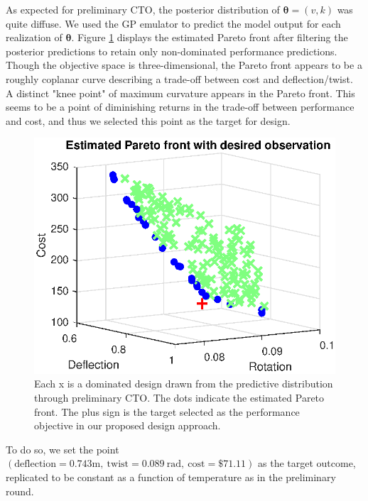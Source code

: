 \documentclass[twocolumn,10pt]{asme2ej}
\begin{document}
%
As expected for preliminary CTO, the posterior distribution of $\boldsymbol\theta = (v, k)$ was quite diffuse.
%
We used the GP emulator to predict the model output for each realization of $\boldsymbol \theta$.
%
Figure \ref{fig:elbow} displays the estimated Pareto front after filtering the posterior predictions to retain only non-dominated performance predictions.
%
Though the objective space is three-dimensional, the Pareto front appears to be a roughly coplanar curve describing a trade-off between cost and deflection/twist.
%
A distinct "knee point" of maximum curvature appears in the Pareto front. 
%
This seems to be a point of diminishing returns in the trade-off between performance and cost, and thus we selected this point as the target for design.
%
\begin{figure}
	\centering
	\includegraphics[scale=0.85]{FIG_est_PF_with_des_obs.eps}
	\caption{Each x is a dominated design drawn from the predictive distribution through preliminary CTO. The dots indicate the estimated Pareto front. The plus sign is the target selected as the performance objective in our proposed design approach.}
	\label{fig:elbow}
\end{figure}
%
To do so, we set the point $(\mathrm{deflection}=0.743\mathrm m,\ 
\mathrm{twist}=0.089\ \mathrm{rad},\ 
\mathrm{cost}=\$71.11)$
as the target outcome, replicated to be constant as a function of temperature as in the preliminary round.
%
\end{document}
